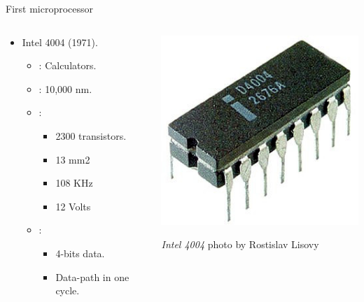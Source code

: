 \begin{frame}[t]{First microprocessor}
\begin{columns}[T]
  \begin{column}{.7\textwidth}
    \begin{itemize}
      \item Intel 4004 (1971).
        \begin{itemize}
          \item {}: Calculators.
          \item {}: 10,000 nm.
          \item {}:
            \begin{itemize}
              \item 2300 transistors.
              \item 13 mm2
              \item 108 KHz
              \item 12 Volts
            \end{itemize}
          \item {}:
            \begin{itemize}
              \item 4-bits data.
              \item Data-path in one cycle.
            \end{itemize}
      \end{itemize}
    \end{itemize}
  \end{column}
  \begin{column}{.3\textwidth}
    \includegraphics[width=.5\textwidth]{images/intel-4004.jpg}\\
    \begin{tiny}
      \emph{Intel 4004} photo by Rostislav Lisovy\\

\end{tiny}
\end{column}
\end{columns}
\end{frame}
